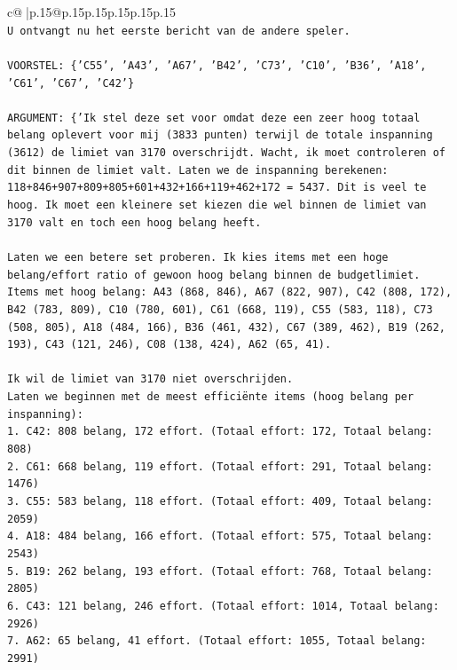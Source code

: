 \documentclass{article}
\begin{document}
{\begin{supertabular}{c@{$\;$}|p{.15\linewidth}@{}p{.15\linewidth}p{.15\linewidth}p{.15\linewidth}p{.15\linewidth}p{.15\linewidth}}
{{{\\ 
\texttt{U ontvangt nu het eerste bericht van de andere speler.} \\
\\ 
\texttt{VOORSTEL: \{'C55', 'A43', 'A67', 'B42', 'C73', 'C10', 'B36', 'A18', 'C61', 'C67', 'C42'\}} \\
\\ 
\texttt{ARGUMENT: \{'Ik stel deze set voor omdat deze een zeer hoog totaal belang oplevert voor mij (3833 punten) terwijl de totale inspanning (3612) de limiet van 3170 overschrijdt. Wacht, ik moet controleren of dit binnen de limiet valt. Laten we de inspanning berekenen: 118+846+907+809+805+601+432+166+119+462+172 = 5437. Dit is veel te hoog. Ik moet een kleinere set kiezen die wel binnen de limiet van 3170 valt en toch een hoog belang heeft.} \\
\\ 
\texttt{Laten we een betere set proberen. Ik kies items met een hoge belang/effort ratio of gewoon hoog belang binnen de budgetlimiet.} \\
\texttt{Items met hoog belang: A43 (868, 846), A67 (822, 907), C42 (808, 172), B42 (783, 809), C10 (780, 601), C61 (668, 119), C55 (583, 118), C73 (508, 805), A18 (484, 166), B36 (461, 432), C67 (389, 462), B19 (262, 193), C43 (121, 246), C08 (138, 424), A62 (65, 41).} \\
\\ 
\texttt{Ik wil de limiet van 3170 niet overschrijden.} \\
\texttt{Laten we beginnen met de meest efficiënte items (hoog belang per inspanning):} \\
\texttt{1. C42: 808 belang, 172 effort. (Totaal effort: 172, Totaal belang: 808)} \\
\texttt{2. C61: 668 belang, 119 effort. (Totaal effort: 291, Totaal belang: 1476)} \\
\texttt{3. C55: 583 belang, 118 effort. (Totaal effort: 409, Totaal belang: 2059)} \\
\texttt{4. A18: 484 belang, 166 effort. (Totaal effort: 575, Totaal belang: 2543)} \\
\texttt{5. B19: 262 belang, 193 effort. (Totaal effort: 768, Totaal belang: 2805)} \\
\texttt{6. C43: 121 belang, 246 effort. (Totaal effort: 1014, Totaal belang: 2926)} \\
\texttt{7. A62: 65 belang, 41 effort. (Totaal effort: 1055, Totaal belang: 2991)} \\
\\ 
}}}
\end{supertabular}}
\end{document}
